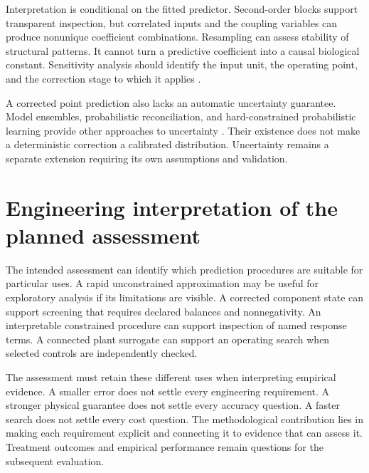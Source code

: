 Interpretation is conditional on the fitted predictor. Second-order blocks support transparent inspection, but correlated inputs and the coupling variables can produce nonunique coefficient combinations. Resampling can assess stability of structural patterns. It cannot turn a predictive coefficient into a causal biological constant. Sensitivity analysis should identify the input unit, the operating point, and the correction stage to which it applies \citep{Machado2014,Brunton2016}.

A corrected point prediction also lacks an automatic uncertainty guarantee. Model ensembles, probabilistic reconciliation, and hard-constrained probabilistic learning provide other approaches to uncertainty \citep{Lakshminarayanan2017,Hansen2024,Utkarsh2025}. Their existence does not make a deterministic correction a calibrated distribution. Uncertainty remains a separate extension requiring its own assumptions and validation.

\section{Engineering interpretation of the planned assessment}

The intended assessment can identify which prediction procedures are suitable for particular uses. A rapid unconstrained approximation may be useful for exploratory analysis if its limitations are visible. A corrected component state can support screening that requires declared balances and nonnegativity. An interpretable constrained procedure can support inspection of named response terms. A connected plant surrogate can support an operating search when selected controls are independently checked.

The assessment must retain these different uses when interpreting empirical evidence. A smaller error does not settle every engineering requirement. A stronger physical guarantee does not settle every accuracy question. A faster search does not settle every cost question. The methodological contribution lies in making each requirement explicit and connecting it to evidence that can assess it. Treatment outcomes and empirical performance remain questions for the subsequent evaluation.
